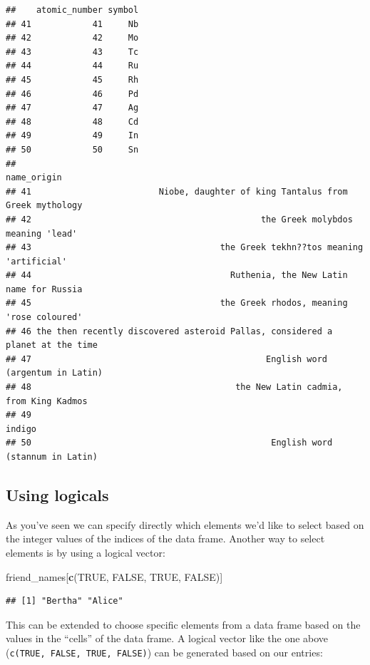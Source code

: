 \documentclass[]{tufte-book}
\newenvironment{Shaded}{\begin{snugshade}}{\end{snugshade}}
\newcommand{\KeywordTok}[1]{\textcolor[rgb]{0.13,0.29,0.53}{\textbf{{#1}}}}
\newcommand{\OtherTok}[1]{\textcolor[rgb]{0.56,0.35,0.01}{{#1}}}
\newcommand{\NormalTok}[1]{{#1}}
\begin{document}
\begin{verbatim}
##    atomic_number symbol
## 41            41     Nb
## 42            42     Mo
## 43            43     Tc
## 44            44     Ru
## 45            45     Rh
## 46            46     Pd
## 47            47     Ag
## 48            48     Cd
## 49            49     In
## 50            50     Sn
##                                                                      name_origin
## 41                         Niobe, daughter of king Tantalus from Greek mythology
## 42                                             the Greek molybdos meaning 'lead'
## 43                                     the Greek tekhn??tos meaning 'artificial'
## 44                                       Ruthenia, the New Latin name for Russia
## 45                                     the Greek rhodos, meaning 'rose coloured'
## 46 the then recently discovered asteroid Pallas, considered a planet at the time
## 47                                              English word (argentum in Latin)
## 48                                        the New Latin cadmia, from King Kadmos
## 49                                                                        indigo
## 50                                               English word (stannum in Latin)
\end{verbatim}

\subsection{Using logicals}\label{using-logicals}

As you've seen we can specify directly which elements we'd like to
select based on the integer values of the indices of the data frame.
Another way to select elements is by using a logical vector:

\begin{Shaded}
\begin{Highlighting}[]
\NormalTok{friend_names[}\KeywordTok{c}\NormalTok{(}\OtherTok{TRUE}\NormalTok{, }\OtherTok{FALSE}\NormalTok{, }\OtherTok{TRUE}\NormalTok{, }\OtherTok{FALSE}\NormalTok{)]}
\end{Highlighting}
\end{Shaded}

\begin{verbatim}
## [1] "Bertha" "Alice"
\end{verbatim}

This can be extended to choose specific elements from a data frame based
on the values in the ``cells'' of the data frame. A logical vector like
the one above (\texttt{c(TRUE,\ FALSE,\ TRUE,\ FALSE)}) can be generated
based on our entries:
\end{document}
